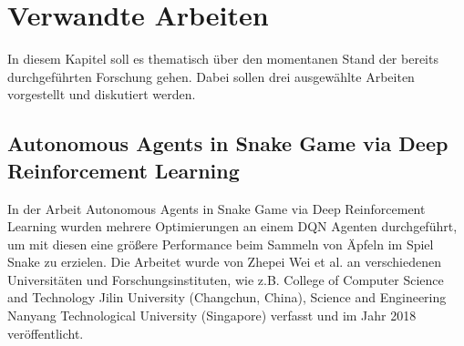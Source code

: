\chapter{Verwandte Arbeiten}
In diesem Kapitel soll es thematisch über den momentanen Stand der bereits durchgeführten Forschung gehen. Dabei sollen drei ausgewählte Arbeiten vorgestellt und diskutiert werden.

\section{Autonomous Agents in Snake Game via Deep Reinforcement Learning}
In der Arbeit Autonomous Agents in Snake Game via Deep Reinforcement Learning wurden mehrere Optimierungen an einem DQN Agenten durchgeführt, um mit diesen eine größere Performance beim Sammeln von Äpfeln im Spiel Snake zu erzielen. Die Arbeitet wurde von Zhepei Wei et al. an verschiedenen Universitäten und Forschungsinstituten, wie z.B. College of Computer Science and Technology Jilin University (Changchun, China), Science and Engineering Nanyang Technological University (Singapore) verfasst und im Jahr 2018 veröffentlicht.

